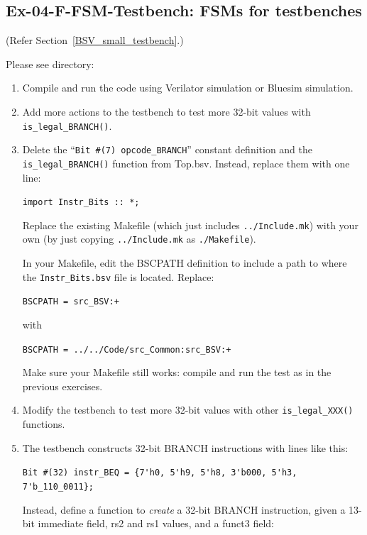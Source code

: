 
\subsection*{Ex-04-F-FSM-Testbench: FSMs for testbenches}
\label{Ex-04-F-FSM-Testbench}

(Refer Section~\ref{BSV_small_testbench}.)

Please see directory: 

\begin{enumerate}

  \item Compile and run the code using Verilator simulation or Bluesim simulation.

  \item Add more actions to the testbench to test more 32-bit values
    with \verb|is_legal_BRANCH()|.

  \item Delete the ``\verb|Bit #(7) opcode_BRANCH|'' constant
    definition and the \verb|is_legal_BRANCH()| function from Top.bsv.
    Instead, replace them with one line:

    \hmm \verb|import Instr_Bits :: *;|

    Replace the existing Makefile (which just includes \verb|../Include.mk|)
    with your own (by just copying \verb|../Include.mk| as \verb|./Makefile|).

    In your Makefile, edit the BSCPATH definition to include a path to
    where the \verb|Instr_Bits.bsv| file is located. Replace:

    \hmm \verb|BSCPATH = src_BSV:+|

    with

    \hmm \verb|BSCPATH = ../../Code/src_Common:src_BSV:+|

    Make sure your Makefile still works: compile and run the test as
    in the previous exercises.

  \item Modify the testbench to test more 32-bit values with other
    \verb|is_legal_XXX()| functions.

  \item The testbench constructs 32-bit BRANCH instructions with lines like this:

    \hmm \verb|Bit #(32) instr_BEQ = {7'h0, 5'h9, 5'h8, 3'b000, 5'h3, 7'b_110_0011};|

    Instead, define a function to \emph{create} a 32-bit BRANCH
    instruction, given a 13-bit immediate field, rs2 and rs1 values,
    and a funct3 field:


\end{enumerate}
